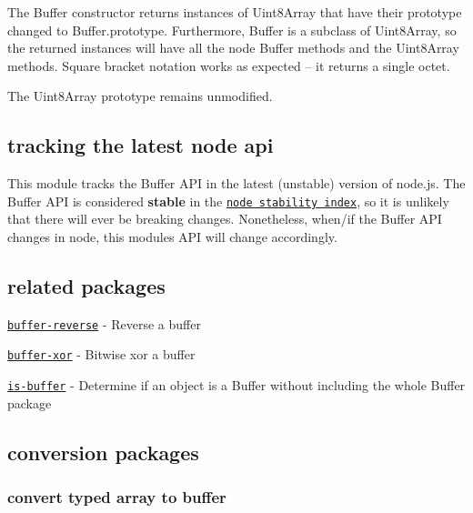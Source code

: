 The Buffer constructor returns instances of {\ttfamily Uint8\+Array} that have their prototype changed to {\ttfamily Buffer.\+prototype}. Furthermore, {\ttfamily Buffer} is a subclass of {\ttfamily Uint8\+Array}, so the returned instances will have all the node {\ttfamily Buffer} methods and the {\ttfamily Uint8\+Array} methods. Square bracket notation works as expected -- it returns a single octet.

The {\ttfamily Uint8\+Array} prototype remains unmodified.

\subsection*{tracking the latest node api}

This module tracks the Buffer A\+PI in the latest (unstable) version of node.\+js. The Buffer A\+PI is considered {\bfseries stable} in the \href{https://nodejs.org/docs/latest/api/documentation.html#documentation_stability_index}{\tt node stability index}, so it is unlikely that there will ever be breaking changes. Nonetheless, when/if the Buffer A\+PI changes in node, this module\textquotesingle{}s A\+PI will change accordingly.

\subsection*{related packages}


\begin{DoxyItemize}
\item \href{https://www.npmjs.com/package/buffer-reverse}{\tt {\ttfamily buffer-\/reverse}} -\/ Reverse a buffer
\item \href{https://www.npmjs.com/package/buffer-xor}{\tt {\ttfamily buffer-\/xor}} -\/ Bitwise xor a buffer
\item \href{https://www.npmjs.com/package/is-buffer}{\tt {\ttfamily is-\/buffer}} -\/ Determine if an object is a Buffer without including the whole {\ttfamily Buffer} package
\end{DoxyItemize}

\subsection*{conversion packages}

\subsubsection*{convert typed array to buffer}

